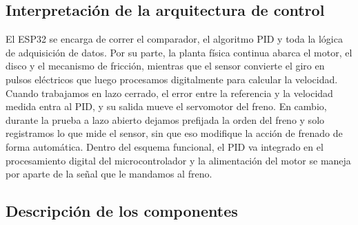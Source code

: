 \documentclass[9pt,a4paper,twocolumn]{extarticle}
\begin{document}
\subsection{Interpretación de la arquitectura de control}
El ESP32 se encarga de correr el comparador, el algoritmo PID y toda la lógica de adquisición de datos. Por su parte, la planta física continua abarca el motor, el disco y el mecanismo de fricción, mientras que el sensor convierte el giro en pulsos eléctricos que luego procesamos digitalmente para calcular la velocidad. Cuando trabajamos en lazo cerrado, el error entre la referencia y la velocidad medida entra al PID, y su salida mueve el servomotor del freno. En cambio, durante la prueba a lazo abierto dejamos prefijada la orden del freno y solo registramos lo que mide el sensor, sin que eso modifique la acción de frenado de forma automática. Dentro del esquema funcional, el PID va integrado en el procesamiento digital del microcontrolador y la alimentación del motor se maneja por aparte de la señal que le mandamos al freno.

\subsection{Descripción de los componentes}
\end{document}
